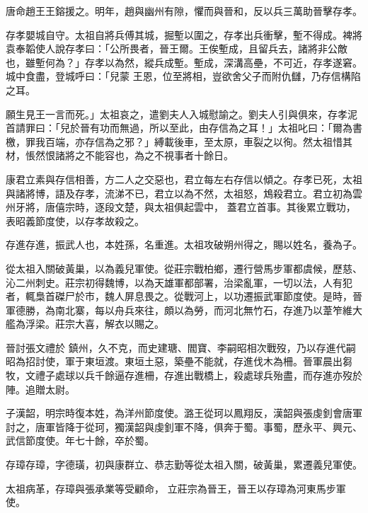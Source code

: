 \begin{pinyinscope}
 唐命趙王王鎔援之。明年，趙與幽州有隙，懼而與晉和，反以兵三萬助晉擊存孝。



 存孝嬰城自守。太祖自將兵傅其城，掘塹以圍之，存孝出兵衝擊，塹不得成。裨將袁奉韜使人說存孝曰：「公所畏者，晉王爾。王俟塹成，且留兵去，諸將非公敵也，雖塹何為？」存孝以為然，縱兵成塹。塹成，深溝高壘，不可近，存孝遂窘。城中食盡，登城呼曰：「兒蒙
 王恩，位至將相，豈欲舍父子而附仇讎，乃存信構陷之耳。



 願生見王一言而死。」太祖哀之，遣劉夫人入城慰諭之。劉夫人引與俱來，存孝泥首請罪曰：「兒於晉有功而無過，所以至此，由存信為之耳！」太祖叱曰：「爾為書檄，罪我百端，亦存信為之邪？」縛載後車，至太原，車裂之以徇。然太祖惜其材，悵然恨諸將之不能容也，為之不視事者十餘日。



 康君立素與存信相善，方二人之交惡也，君立每左右存信以傾之。存孝已死，太祖與諸將博，語及存孝，流涕不已，君立以為不然，太祖怒，鴆殺君立。君立初為雲州牙將，唐僖宗時，逐段文楚，與太祖俱起雲中，
 蓋君立首事。其後累立戰功，表昭義節度使，以存孝故殺之。



 存進存進，振武人也，本姓孫，名重進。太祖攻破朔州得之，賜以姓名，養為子。



 從太祖入關破黃巢，以為義兒軍使。從莊宗戰柏鄉，遷行營馬步軍都虞候，歷慈、沁二州刺史。莊宗初得魏博，以為天雄軍都部署，治梁亂軍，一切以法，人有犯者，輒梟首磔尸於市，魏人屏息畏之。從戰河上，以功遷振武軍節度使。是時，晉軍德勝，為南北寨，每以舟兵來往，頗以為勞，而河北無竹石，存進乃以葦笮維大艦為浮梁。莊宗大喜，解衣以賜之。



 晉討張文禮於
 鎮州，久不克，而史建瑭、閻寶、李嗣昭相次戰歿，乃以存進代嗣昭為招討使，軍于東垣渡。東垣土惡，築壘不能就，存進伐木為柵。晉軍晨出芻牧，文禮子處球以兵千餘逼存進柵，存進出戰橋上，殺處球兵殆盡，而存進亦歿於陣。追贈太尉。



 子漢韶，明宗時復本姓，為洋州節度使。潞王從珂以鳳翔反，漢韶與張虔釗會唐軍討之，唐軍皆降于從珂，獨漢韶與虔釗軍不降，俱奔于蜀。事蜀，歷永平、興元、武信節度使。年七十餘，卒於蜀。



 存璋存璋，字德璜，初與康群立、恭志勤等從太祖入關，破黃巢，累遷義兒軍使。



 太祖病革，存璋與張承業等受顧命，
 立莊宗為晉王，晉王以存璋為河東馬步軍使。




\end{pinyinscope}
